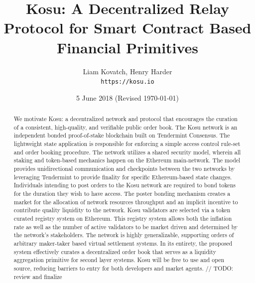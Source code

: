 \documentclass[10pt]{article}
\begin{document}

\title{ \textbf{Kosu: A Decentralized Relay Protocol for Smart Contract Based Financial Primitives} } 
\author{Liam Kovatch, Henry Harder \\\texttt{https://kosu.io}}
\date{5 June 2018 (Revised \today)}
\maketitle 


\begin{abstract}
   We motivate Kosu: a decentralized network and protocol that encourages the curation of a consistent, high-quality, and verifiable public order book. The Kosu network is an independent bonded proof-of-stake blockchain built on Tendermint Consensus. The lightweight state application is responsible for enforcing a simple access control rule-set and order booking procedure. The network utilizes a shared security model, wherein all staking and token-based mechanics happen on the Ethereum main-network. The model provides unidirectional communication and checkpoints between the two networks by leveraging Tendermint to provide finality for specific Ethereum-based state changes. Individuals intending to post orders to the Kosu network are required to bond tokens for the duration they wish to have access. The poster bonding mechanism creates a market for the allocation of network resources throughput and an implicit incentive to contribute quality liquidity to the network. Kosu validators are selected via a token curated registry system on Ethereum. This registry system allows both the inflation rate as well as the number of active validators to be market driven and determined by the network’s stakeholders. The network is highly generalizable, supporting orders of arbitrary maker-taker based virtual settlement systems. In its entirety, the proposed system effectively curates a decentralized order book that serves as a liquidity aggregation primitive for second layer systems. Kosu will be free to use and open source, reducing barriers to entry for both developers and market agents. // TODO: review and finalize
   \medskip
\end{abstract}
\pagebreak
\end{document}
